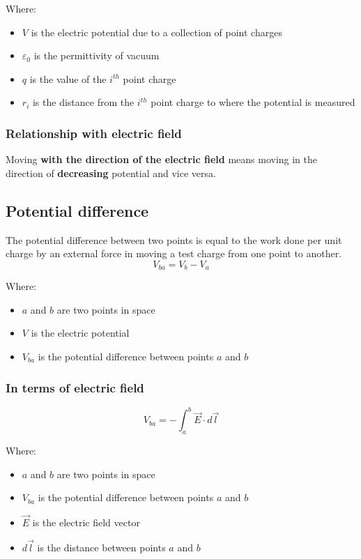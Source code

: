 \documentclass[11pt]{article}
\begin{document}
Where:
\begin{itemize}
\item \(V\) is the electric potential due to a collection of point charges
\item \(\varepsilon_0\) is the permittivity of vacuum
\item \(q\) is the value of the \(i^{th}\) point charge
\item \(r_i\) is the distance from the \(i^{th}\) point charge to where the potential is measured
\end{itemize}

\subsubsection{Relationship with electric field}
\label{sec:org6aaa5de}
Moving \textbf{with the direction of the electric field} means moving in the direction of \textbf{decreasing} potential and vice versa.

\newpage

\subsection{Potential difference}
\label{sec:org6236f3c}
The potential difference between two points is equal to the work done per unit charge by an external force in moving a test charge from one point to another.
\[V_{ba} = V_{b} - V_{a}\]

Where:
\begin{itemize}
\item \(a\) and \(b\) are two points in space
\item \(V\) is the electric potential
\item \(V_{ba}\) is the potential difference between points \(a\) and \(b\)
\end{itemize}

\subsubsection{In terms of electric field}
\label{sec:org44ec8ed}
\[V_{ba} = - \int_a^b \vec{E} \cdot d \vec{l}\]

Where:
\begin{itemize}
\item \(a\) and \(b\) are two points in space
\item \(V_{ba}\) is the potential difference between points \(a\) and \(b\)
\item \(\vec{E}\) is the electric field vector
\item \(d \vec{l}\) is the distance between points \(a\) and \(b\)
\end{itemize}
\end{document}

